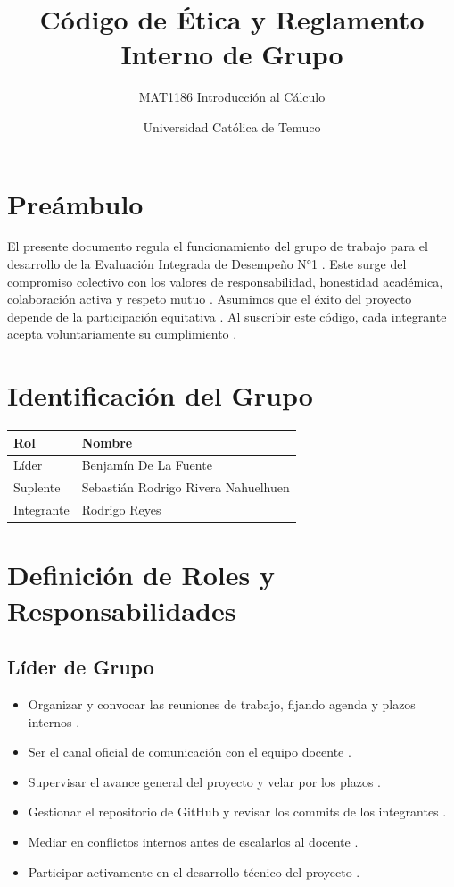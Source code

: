 \documentclass[11pt, a4paper]{article}
\title{\textbf{Código de Ética y Reglamento Interno de Grupo} \cite{3, 4}}
\author{MAT1186 Introducción al Cálculo \cite{13}}
\date{Universidad Católica de Temuco \cite{15}}
\begin{document}
\maketitle

\section*{Preámbulo}
El presente documento regula el funcionamiento del grupo de trabajo para el desarrollo de la Evaluación Integrada de Desempeño N°1 \cite{16}. Este surge del compromiso colectivo con los valores de responsabilidad, honestidad académica, colaboración activa y respeto mutuo \cite{17}. Asumimos que el éxito del proyecto depende de la participación equitativa \cite{18}. Al suscribir este código, cada integrante acepta voluntariamente su cumplimiento \cite{19}.

\section{Identificación del Grupo}
\begin{table}[h!]
\centering
\begin{tabularx}{\textwidth}{lX}
\toprule
\textbf{Rol} & \textbf{Nombre} \\
\midrule
Líder & Benjamín De La Fuente \cite{24} \\
Suplente & Sebastián Rodrigo Rivera Nahuelhuen \cite{24} \\
Integrante & Rodrigo Reyes \cite{24} \\
\bottomrule
\end{tabularx}
\end{table}

\section{Definición de Roles y Responsabilidades}

\subsection{Líder de Grupo}
\begin{itemize}
    \item Organizar y convocar las reuniones de trabajo, fijando agenda y plazos internos \cite{27}.
    \item Ser el canal oficial de comunicación con el equipo docente \cite{28}.
    \item Supervisar el avance general del proyecto y velar por los plazos \cite{29}.
    \item Gestionar el repositorio de GitHub y revisar los commits de los integrantes \cite{30}.
    \item Mediar en conflictos internos antes de escalarlos al docente \cite{31}.
    \item Participar activamente en el desarrollo técnico del proyecto \cite{32}.
\end{itemize}
\end{document}

